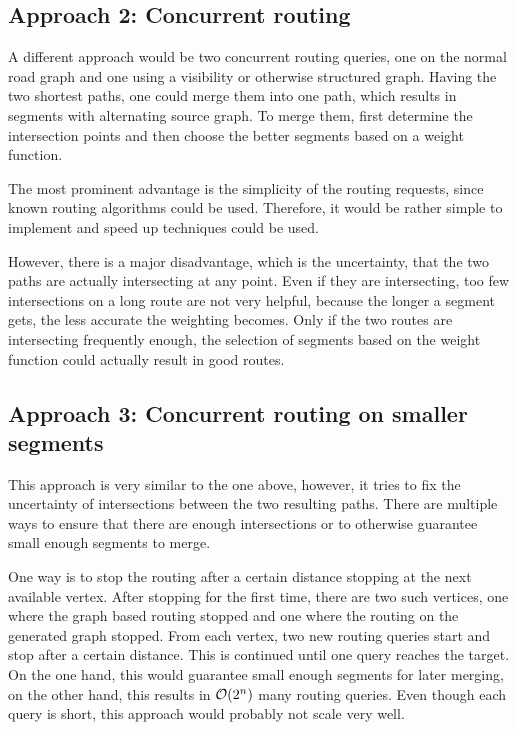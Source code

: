 	\subsection{Approach 2: Concurrent routing}
	
		A different approach would be two concurrent routing queries, one on the normal road graph and one using a visibility or otherwise structured graph.
		Having the two shortest paths, one could merge them into one path, which results in segments with alternating source graph.
		To merge them, first determine the intersection points and then choose the better segments based on a weight function.
		
		The most prominent advantage is the simplicity of the routing requests, since known routing algorithms could be used.
		Therefore, it would be rather simple to implement and speed up techniques could be used.
		
		However, there is a major disadvantage, which is the uncertainty, that the two paths are actually intersecting at any point.
		Even if they are intersecting, too few intersections on a long route are not very helpful, because the longer a segment gets, the less accurate the weighting becomes.
		Only if the two routes are intersecting frequently enough, the selection of segments based on the weight function could actually result in good routes.
	
	\subsection{Approach 3: Concurrent routing on smaller segments}
	
		This approach is very similar to the one above, however, it tries to fix the uncertainty of intersections between the two resulting paths.
		There are multiple ways to ensure that there are enough intersections or to otherwise guarantee small enough segments to merge.
		
		One way is to stop the routing after a certain distance stopping at the next available vertex.
		After stopping for the first time, there are two such vertices, one where the graph based routing stopped and one where the routing on the generated graph stopped.
		From each vertex, two new routing queries start and stop after a certain distance.
		This is continued until one query reaches the target.
		On the one hand, this would guarantee small enough segments for later merging, on the other hand, this results in $\mathcal{O}(2^n)$ many routing queries.
		Even though each query is short, this approach would probably not scale very well.
		
